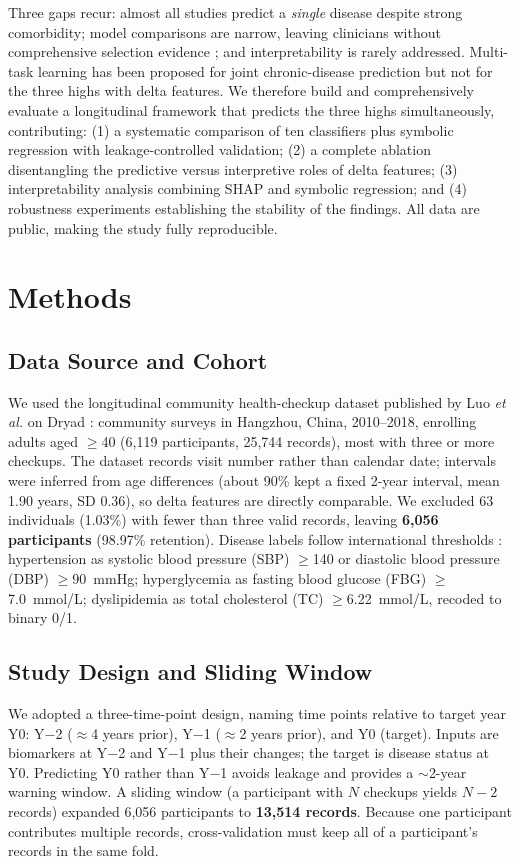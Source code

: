 \documentclass[journal]{IEEEtran}
\begin{document}
Three gaps recur: almost all studies predict a \emph{single} disease despite strong comorbidity; model comparisons are narrow, leaving clinicians without comprehensive selection evidence \cite{ref18}; and interpretability is rarely addressed. Multi-task learning has been proposed for joint chronic-disease prediction \cite{ref19} but not for the three highs with delta features. We therefore build and comprehensively evaluate a longitudinal framework that predicts the three highs simultaneously, contributing: (1) a systematic comparison of ten classifiers plus symbolic regression with leakage-controlled validation; (2) a complete ablation disentangling the predictive versus interpretive roles of delta features; (3) interpretability analysis combining SHAP and symbolic regression; and (4) robustness experiments establishing the stability of the findings. All data are public, making the study fully reproducible.

\section{Methods}
\subsection{Data Source and Cohort}
We used the longitudinal community health-checkup dataset published by Luo \textit{et al.} on Dryad \cite{ref20,ref21}: community surveys in Hangzhou, China, 2010--2018, enrolling adults aged $\geq$40 (6,119 participants, 25,744 records), most with three or more checkups. The dataset records visit number rather than calendar date; intervals were inferred from age differences (about 90\% kept a fixed 2-year interval, mean 1.90 years, SD 0.36), so delta features are directly comparable. We excluded 63 individuals (1.03\%) with fewer than three valid records, leaving \textbf{6,056 participants} (98.97\% retention). Disease labels follow international thresholds \cite{ref22,ref23,ref24}: hypertension as systolic blood pressure (SBP) $\geq$140 or diastolic blood pressure (DBP) $\geq$90~mmHg; hyperglycemia as fasting blood glucose (FBG) $\geq$7.0~mmol/L; dyslipidemia as total cholesterol (TC) $\geq$6.22~mmol/L, recoded to binary 0/1.

\subsection{Study Design and Sliding Window}
We adopted a three-time-point design, naming time points relative to target year Y0: Y$-$2 ($\approx$4 years prior), Y$-$1 ($\approx$2 years prior), and Y0 (target). Inputs are biomarkers at Y$-$2 and Y$-$1 plus their changes; the target is disease status at Y0. Predicting Y0 rather than Y$-$1 avoids leakage and provides a $\sim$2-year warning window. A sliding window (a participant with $N$ checkups yields $N-2$ records) expanded 6,056 participants to \textbf{13,514 records}. Because one participant contributes multiple records, cross-validation must keep all of a participant's records in the same fold.
\end{document}
